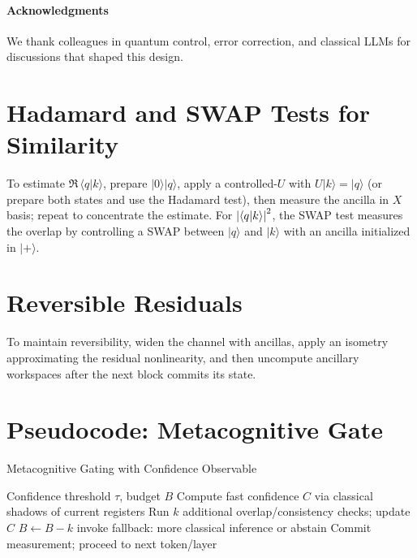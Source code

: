 \documentclass[11pt]{article}
\newcommand{\qket}[1]{\lvert #1 \rangle}
\newcommand{\qip}[2]{\langle #1 \vert #2 \rangle}
\begin{document}
\paragraph{Acknowledgments}
We thank colleagues in quantum control, error correction, and classical LLMs for discussions that shaped this design.

\appendix

\section{Hadamard and SWAP Tests for Similarity}

To estimate $\Re\,\qip{q}{k}$, prepare $\qket{0}\qket{q}$, apply a controlled-$U$ with $U\qket{k}=\qket{q}$ (or prepare both states and use the Hadamard test), then measure the ancilla in $X$ basis; repeat to concentrate the estimate.
For $\abs{\qip{q}{k}}^2$, the SWAP test measures the overlap by controlling a SWAP between $\qket{q}$ and $\qket{k}$ with an ancilla initialized in $\qket{+}$.

\section{Reversible Residuals}
To maintain reversibility, widen the channel with ancillas, apply an isometry approximating the residual nonlinearity, and then uncompute ancillary workspaces after the next block commits its state.

\section{Pseudocode: Metacognitive Gate}
\begin{algorithm}[h]
\caption{Metacognitive Gating with Confidence Observable}
\label{alg:meta}
\begin{algorithmic}[1]
\Require Confidence threshold $\tau$, budget $B$
\State Compute fast confidence $C$ via classical shadows of current registers
  \State Run $k$ additional overlap/consistency checks; update $C$
  \State $B \gets B - k$
   invoke fallback: more classical inference or abstain
\EndIf
\State Commit measurement; proceed to next token/layer
\end{algorithmic}
\end{algorithm}
\end{document}
